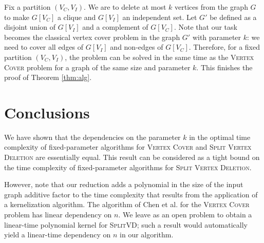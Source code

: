 \documentclass{article}
\newcommand{\splitlong}{\textsc{Split Vertex Deletion}\xspace}
\newcommand{\splitvd}{\textsc{SplitVD}\xspace}
\newcommand{\vertexcover}{\textsc{Vertex Cover}\xspace}
\theoremstyle{definition}
\begin{document}
Fix a partition $(V_C,V_I)$. We are to delete at most $k$ vertices from the graph $G$
to make $G[V_C]$ a clique and $G[V_I]$ an independent set.
Let $G'$ be defined as a disjoint union of $G[V_I]$ and a complement of $G[V_C]$.
Note that our task becomes the classical vertex cover problem in the graph $G'$ with parameter $k$: we need to
cover all edges of $G[V_I]$ and non-edges of $G[V_C]$. Therefore, for a fixed partition $(V_C,V_I)$,
the problem can be solved in the same time as the \vertexcover problem for a graph of the same size and parameter $k$.
This finishes the proof of Theorem \ref{thm:alg}.

\section{Conclusions}

We have shown that the dependencies on the parameter $k$ in the optimal time complexity of fixed-parameter algorithms
for \vertexcover and \splitlong are essentially equal.
This result can be considered as a tight bound on the time complexity of fixed-parameter algorithms for \splitlong.

However, note that our reduction adds a polynomial in the size of the input graph additive factor to the time complexity
that results from the application of a kernelization algorithm.
The algorithm of Chen et al. \cite{vc:best} for the \vertexcover problem has linear dependency on $n$.
We leave as an open problem to obtain a linear-time polynomial kernel for \splitvd; such a result would
automatically yield a linear-time dependency on $n$ in our algorithm.



\end{document}
